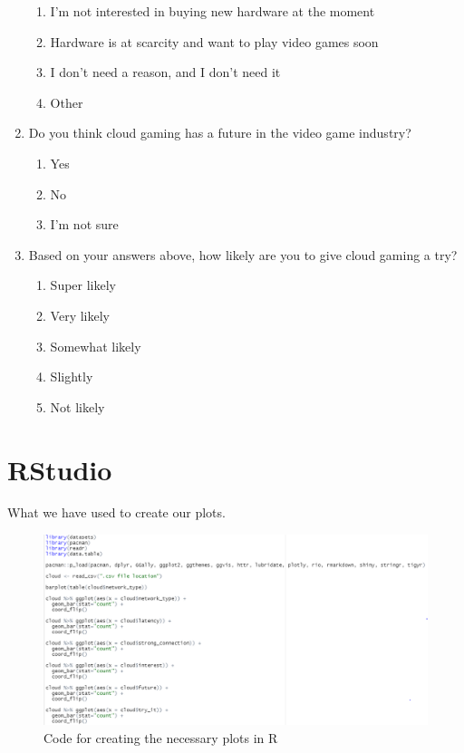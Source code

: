 \begin{enumerate}
\begin{enumerate}
		\item I'm not interested in buying new hardware at the moment
		\item Hardware is at scarcity and want to play video games soon
		\item I don't need a reason, and I don't need it
		\item Other
	\end{enumerate}
	\item Do you think cloud gaming has a future in the video game industry?
	\begin{enumerate}
		\item Yes
		\item No
		\item I'm not sure
	\end{enumerate}
	\item Based on your answers above, how likely are you to give cloud gaming a try?
	\begin{enumerate}
		\item Super likely
		\item Very likely
		\item Somewhat likely
		\item Slightly
		\item Not likely
	\end{enumerate}
	
\end{enumerate}
\chapter{RStudio}
What we have used to create our plots.
\begin{figure}[H]
	\centering
	\includegraphics[width=16cm]{../img/R.png}
	\caption{Code for creating the necessary plots in R}
\end{figure}
